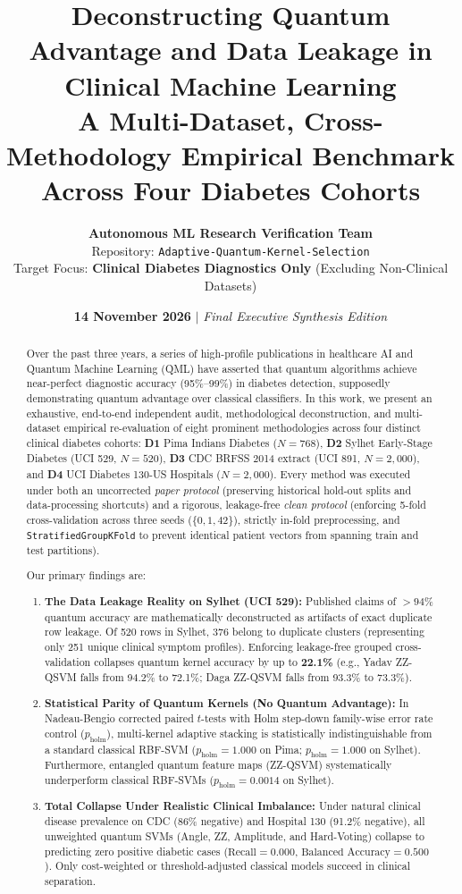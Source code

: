 \documentclass[11pt,a4paper]{article}
\title{\vspace{-1.0cm}\textbf{\huge\textcolor{oxfordblue}{Deconstructing Quantum Advantage and Data Leakage in Clinical Machine Learning}}\\[0.4em]
\Large\textbf{A Multi-Dataset, Cross-Methodology Empirical Benchmark Across Four Diabetes Cohorts}}
\author{\textbf{Autonomous ML Research Verification Team} \\
Repository: \texttt{Adaptive-Quantum-Kernel-Selection} \\
Target Focus: \textbf{Clinical Diabetes Diagnostics Only} (Excluding Non-Clinical Datasets)}
\date{\textbf{14 November 2026} \quad $\vert$ \quad \textit{Final Executive Synthesis Edition}}
\begin{document}
\maketitle
\thispagestyle{fancy}

\begin{abstract}
\noindent Over the past three years, a series of high-profile publications in healthcare AI and Quantum Machine Learning (QML) have asserted that quantum algorithms achieve near-perfect diagnostic accuracy (95\%--99\%) in diabetes detection, supposedly demonstrating quantum advantage over classical classifiers. In this work, we present an exhaustive, end-to-end independent audit, methodological deconstruction, and multi-dataset empirical re-evaluation of eight prominent methodologies across four distinct clinical diabetes cohorts: \textbf{D1} Pima Indians Diabetes ($N=768$), \textbf{D2} Sylhet Early-Stage Diabetes (UCI 529, $N=520$), \textbf{D3} CDC BRFSS 2014 extract (UCI 891, $N=2{,}000$), and \textbf{D4} UCI Diabetes 130-US Hospitals ($N=2{,}000$). Every method was executed under both an uncorrected \emph{paper protocol} (preserving historical hold-out splits and data-processing shortcuts) and a rigorous, leakage-free \emph{clean protocol} (enforcing 5-fold cross-validation across three seeds ($\{0, 1, 42\}$), strictly in-fold preprocessing, and \texttt{StratifiedGroupKFold} to prevent identical patient vectors from spanning train and test partitions). 

Our primary findings are: 
\begin{enumerate}[leftmargin=1.5em,topsep=1pt,itemsep=1pt]
    \item \textbf{The Data Leakage Reality on Sylhet (UCI 529):} Published claims of $>94\%$ quantum accuracy are mathematically deconstructed as artifacts of exact duplicate row leakage. Of 520 rows in Sylhet, 376 belong to duplicate clusters (representing only 251 unique clinical symptom profiles). Enforcing leakage-free grouped cross-validation collapses quantum kernel accuracy by up to \textbf{22.1\%} (e.g., Yadav ZZ-QSVM falls from 94.2\% to 72.1\%; Daga ZZ-QSVM falls from 93.3\% to 73.3\%).
    \item \textbf{Statistical Parity of Quantum Kernels (No Quantum Advantage):} In Nadeau-Bengio corrected paired $t$-tests with Holm step-down family-wise error rate control ($p_{\text{holm}}$), multi-kernel adaptive stacking is statistically indistinguishable from a standard classical RBF-SVM ($p_{\text{holm}} = 1.000$ on Pima; $p_{\text{holm}} = 1.000$ on Sylhet). Furthermore, entangled quantum feature maps (ZZ-QSVM) systematically underperform classical RBF-SVMs ($p_{\text{holm}} = 0.0014$ on Sylhet).
    \item \textbf{Total Collapse Under Realistic Clinical Imbalance:} Under natural clinical disease prevalence on CDC (86\% negative) and Hospital 130 (91.2\% negative), all unweighted quantum SVMs (Angle, ZZ, Amplitude, and Hard-Voting) collapse to predicting zero positive diabetic cases ($\text{Recall} = 0.000$, $\text{Balanced Accuracy} = 0.500$). Only cost-weighted or threshold-adjusted classical models succeed in clinical separation.
\end{enumerate}
\end{abstract}
\end{document}
